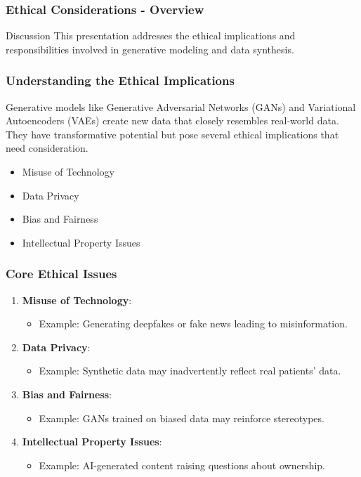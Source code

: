 \documentclass[aspectratio=169]{beamer}
\begin{document}
\begin{frame}[fragile]
    \frametitle{Ethical Considerations - Overview}
    \begin{block}{Discussion}
        This presentation addresses the ethical implications and responsibilities involved in generative modeling and data synthesis.
    \end{block}
\end{frame}

\begin{frame}[fragile]
    \frametitle{Understanding the Ethical Implications}
    Generative models like Generative Adversarial Networks (GANs) and Variational Autoencoders (VAEs) create new data that closely resembles real-world data. They have transformative potential but pose several ethical implications that need consideration. 

    \begin{itemize}
        \item Misuse of Technology
        \item Data Privacy
        \item Bias and Fairness
        \item Intellectual Property Issues
    \end{itemize}
\end{frame}

\begin{frame}[fragile]
    \frametitle{Core Ethical Issues}
    \begin{enumerate}
        \item \textbf{Misuse of Technology}: 
        \begin{itemize}
            \item Example: Generating deepfakes or fake news leading to misinformation.
        \end{itemize}
        
        \item \textbf{Data Privacy}: 
        \begin{itemize}
            \item Example: Synthetic data may inadvertently reflect real patients' data.
        \end{itemize}
        
        \item \textbf{Bias and Fairness}: 
        \begin{itemize}
            \item Example: GANs trained on biased data may reinforce stereotypes.
        \end{itemize}
        
        \item \textbf{Intellectual Property Issues}: 
        \begin{itemize}
            \item Example: AI-generated content raising questions about ownership.
        \end{itemize}
    \end{enumerate}
\end{frame}
\end{document}
